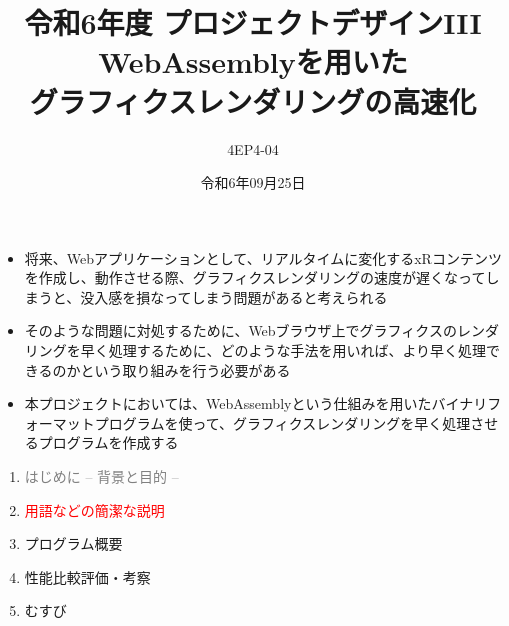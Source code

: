 % 
%

\title{
{\normalsize 令和6年度 プロジェクトデザインIII}\\\vspace{10mm}
{\LARGE WebAssemblyを用いた\\グラフィクスレンダリングの高速化}
}
\date{令和6年09月25日}
\author{
4EP4-04\\ 
}




\maketitle %
\addtocounter{page}{1}
\thispagestyle{myfirstpage}

\begin{itemize}
 \item 将来、Webアプリケーションとして、リアルタイムに変化するxRコンテンツを作成し、動作させる際、グラフィクスレンダリングの速度が遅くなってしまうと、没入感を損なってしまう問題があると考えられる
 \item そのような問題に対処するために、Webブラウザ上でグラフィクスのレンダリングを早く処理するために、どのような手法を用いれば、より早く処理できるのかという取り組みを行う必要がある
 \item 本プロジェクトにおいては、WebAssemblyという仕組みを用いたバイナリフォーマットプログラムを使って、グラフィクスレンダリングを早く処理させるプログラムを作成する
\end{itemize}
\newpage

\begin{enumerate}[itemsep=0.25\zh]
	\item \textcolor{gray}{はじめに -- 背景と目的 --}
	\item \textcolor{red}{用語などの簡潔な説明}
	\item プログラム概要
	\item 性能比較評価・考察
	\item むすび
\end{enumerate}
\newpage

